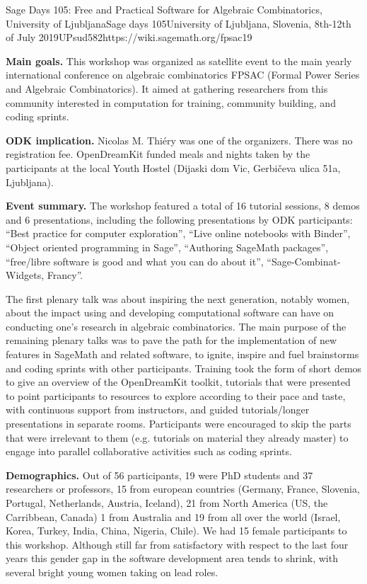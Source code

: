 \begin{event}{Sage Days 105: Free and Practical Software for Algebraic Combinatorics, University of Ljubljana}{Sage days 105}{University of Ljubljana, Slovenia,
8th-12th of July 2019}{UPsud}{58}{2}{https://wiki.sagemath.org/fpsac19}

\textbf{Main goals.} This workshop was organized as satellite event to
the main yearly international conference on algebraic combinatorics
FPSAC (Formal Power Series and Algebraic Combinatorics). It aimed at
gathering researchers from this community interested in computation
for training, community building, and coding sprints.

\textbf{ODK implication.} Nicolas M. Thiéry  was one of the organizers.
There was no registration fee. OpenDreamKit funded meals and nights taken by the participants 
at the local Youth Hostel (Dijaski dom Vic, Gerbičeva ulica 51a, Ljubljana). 

\textbf{Event summary.} The workshop featured a total of 16 tutorial
sessions, 8 demos and 6 presentations, including the following
presentations by ODK participants: ``Best practice for computer
exploration'', ``Live online notebooks with Binder'', ``Object
oriented programming in Sage'', ``Authoring SageMath packages'',
``free/libre software is good and what you can do about it'',
``Sage-Combinat-Widgets, Francy''.

The first plenary talk was about inspiring the next generation,
notably women, about the impact using and developing computational
software can have on conducting one's research in algebraic
combinatorics. The main purpose of the remaining plenary talks was to
pave the path for the implementation of new features in SageMath and
related software, to ignite, inspire and fuel brainstorms and coding
sprints with other participants. Training took the form of short demos
to give an overview of the OpenDreamKit toolkit, tutorials that were
presented to point participants to resources to explore according to
their pace and taste, with continuous support from instructors, and
guided tutorials/longer presentations in separate rooms. Participants
were encouraged to skip the parts that were irrelevant to them (e.g.
tutorials on material they already master) to engage into parallel
collaborative activities such as coding sprints.

\textbf{Demographics.} Out of 56 participants, 19 were PhD students
and 37 researchers or professors, 15 from european countries 
(Germany, France, Slovenia, Portugal, Netherlands, Austria, Iceland), 21 from North America (US, the Carribbean, Canada) 
1 from Australia and 19 from all over the world (Israel, Korea, Turkey, India, China, Nigeria, Chile).
We had 15 female participants to this workshop. Although still far
from satisfactory with respect to the last four years
this gender gap in the software development area tends to shrink, with
several bright young women taking on lead roles.


\end{event}
